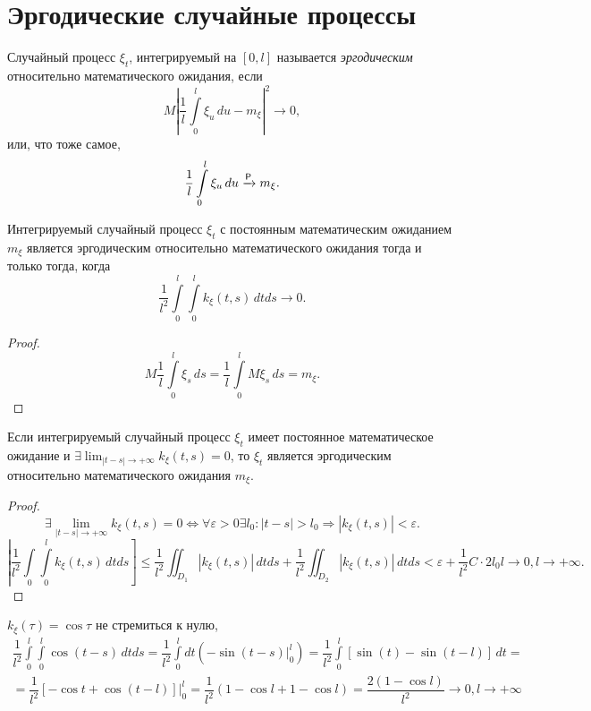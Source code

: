 \section{Эргодические случайные процессы}

\begin{definition}
  Случайный процесс $\xi_t$, интегрируемый на $[0, l]$ называется
  \emph{эргодическим} относительно математического ожидания, если
  \[
    M \left| \dfrac{1}{l} \int\limits_0^l \xi_u \, du - m_\xi \right|^2 \to 0,
  \]
  или, что тоже самое,
  \[
    \dfrac{1}{l} \int\limits_0^l \xi_u \, du \xrightarrow[]{\mathsf P} m_\xi.
  \]
\end{definition}


\begin{theorem}
  Интегрируемый случайный процесс $\xi_t$ с постоянным математическим ожиданием $m_\xi$
  является эргодическим относительно математического ожидания тогда и только тогда,
  когда 
  \[
    \dfrac{1}{l^2} \int\limits_0^l \int\limits_0^l k_\xi(t, s) \, dt ds \to 0.
  \]
\end{theorem}
\begin{proof}
  \[
    M \dfrac{1}{l} \int\limits_0^l \xi_s \, ds = \dfrac{1}{l} \int\limits_0^l M\xi_s \, ds = m_\xi.
  \]
\end{proof}

\begin{theorem}
  Если интегрируемый случайный процесс $\xi_t$ имеет постоянное математическое ожидание и
  $\exists \lim_{|t-s| \to +\infty} k_\xi(t, s) = 0$, то $\xi_t$ является эргодическим относительно
  математического ожидания $m_\xi$.
\end{theorem}
\begin{proof}
  \[
    \exists \lim_{|t-s| \to +\infty} k_\xi(t, s) = 0
    \Leftrightarrow
    \forall \varepsilon > 0 \exists l_0 : |t-s|>l_0 \Rightarrow |k_\xi(t, s)| < \varepsilon.
  \]
  \[
  \left| \dfrac{1}{l^2} \int\limits_0 \int\limits_0^l k_\xi(t, s) \, dt ds \right]
  \leqslant \dfrac{1}{l^2} \iint_{D_1} |k_\xi(t, s)| \, dt ds + \dfrac{1}{l^2} \iint_{D_2} |k_\xi(t, s)| \, dt ds < \varepsilon + \dfrac{1}{l^2} C \cdot 2 l_0 l \to 0, l\to+\infty.
  \]
\end{proof}

\begin{ex}
  $k_\xi(\tau) = \cos \tau$ не стремиться к нулю, 
  \begin{multline*}
    \dfrac{1}{l^2} \int\limits_0^l \int\limits_0^l \cos(t-s) \, dt ds
    = \dfrac{1}{l^2} \int\limits_0^l dt \left(-\sin(t-s) |_0^l \right)
    = \dfrac{1}{l^2} \int\limits_0^l \left[ \sin(t) - \sin (t-l) \right] \, dt = \\
    = \dfrac{1}{l^2} \left[ - \cos t + \cos(t-l) \right] |_0^l
    = \dfrac{1}{l^2} \left( 1 - \cos l + 1 - \cos l \right) 
    = \dfrac{2 (1 - \cos l)}{l^2} \to 0, l \to + \infty
  \end{multline*}
\end{ex}

